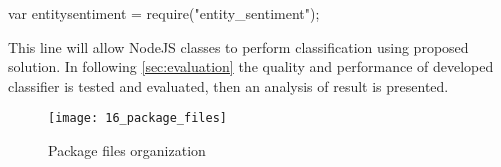  \begin{displayquote}
var entitysentiment = require("entity\_sentiment");
\end{displayquote} 

This line will allow NodeJS classes to perform classification using proposed solution. In following \autoref{sec:evaluation} the quality and performance of developed classifier is tested and evaluated, then an analysis of result is presented. 

\begin{figure}[H]
    \centering
    \caption[Package files organization]{Package files organization}
    \texttt{[image: 16\_package\_files]}
    \label{fig16:package_files}
\end{figure}
